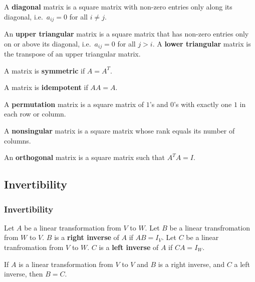 \documentclass[compress]{beamer}
\theoremstyle{definition}
\begin{document}
\begin{frame}
  \begin{definition}
    A \textbf{diagonal} matrix is a square matrix with non-zero entries
    only along its diagonal, i.e.\ $a_{ij} = 0$ for all $i \neq j$. 
  \end{definition}

  \begin{definition}
    An \textbf{upper triangular} matrix is a square matrix that has
    non-zero entries only on or above its diagonal, i.e.\ $a_{ij} = 0$
    for all $j>i$. A \textbf{lower triangular} matrix is the transpose
    of an upper triangular matrix.
  \end{definition}
  
  \begin{definition}
    A matrix is \textbf{symmetric} if $A = A^T$.
  \end{definition}
\end{frame}

\begin{frame}
  \begin{definition}
    A matrix is \textbf{idempotent} if $AA = A$.
  \end{definition}
  
  \begin{definition}
    A \textbf{permutation} matrix is a square matrix of $1$'s and $0$'s
    with exactly one $1$ in each row or column.  
  \end{definition}
  
  \begin{definition}
    A \textbf{nonsingular} matrix is a square matrix whose rank equals
    its number of columns.
  \end{definition}
  
  \begin{definition}
    An \textbf{orthogonal} matrix is a square matrix such that $A^TA =
    I$.
  \end{definition}
\end{frame}

\subsection{Invertibility}

\begin{frame}
  \frametitle{Invertibility}
  \begin{definition}
    Let $A$ be a linear transformation from $V$ to $W$. Let $B$ be a
    linear transfromation from $W$ to $V$. $B$ is a \textbf{right
      inverse} of $A$ if $AB = I_V$. Let $C$ be a linear tranfromation
    from $V$ to $W$. $C$ is a \textbf{left inverse} of $A$ if $CA = I_W$. 
  \end{definition}  
  
  \begin{lemma}
    If $A$ is a linear transformation from $V$ to $V$ and $B$ is a right
    inverse, and $C$ a left inverse, then $B = C$. 
  \end{lemma}
\end{frame}
\end{document}
